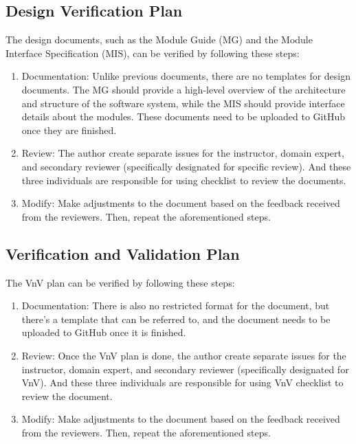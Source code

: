 \documentclass[12pt, titlepage]{article}
\begin{document}
\subsection{Design Verification Plan}
The design documents, such as the Module Guide (MG) and the Module Interface Specification (MIS), can be verified by following these steps:
\begin{enumerate}
    \item Documentation: Unlike previous documents, there are no templates for design documents. The MG should provide a high-level overview of the architecture and structure of the software system, while the MIS should provide interface details about the modules. These documents need to be uploaded to GitHub once they are finished.
    \item Review: The author create separate issues for the instructor, domain expert, and secondary reviewer (specifically designated for specific review). And these three individuals are responsible for using checklist \cite{mgcheck} \cite{mischeck} to review the documents.
    \item Modify: Make adjustments to the document based on the feedback received from the reviewers. Then, repeat the aforementioned steps.
\end{enumerate}

\subsection{Verification and Validation Plan}

The VnV plan can be verified by following these steps:

\begin{enumerate}
    \item Documentation: There is also no restricted format for the document, but there's a template \cite{vnvtem} that can be referred to, and the document needs to be uploaded to GitHub once it is finished.
    \item Review: Once the VnV plan is done, the author create separate issues for the instructor, domain expert, and secondary reviewer (specifically designated for VnV). And these three individuals are responsible for using VnV checklist \cite{vnvcheck}to review the document.
    \item Modify: Make adjustments to the document based on the feedback received from the reviewers. Then, repeat the aforementioned steps.
\end{enumerate}
\end{document}
